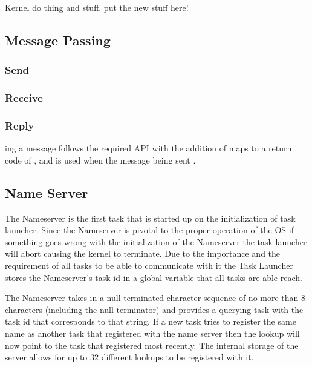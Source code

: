 \documentclass[pdftex,10pt,a4paper]{article}
\begin{document}
Kernel do thing and stuff. put the new stuff here!

\subsection*{Message Passing}

\subsubsection*{Send}

\subsubsection*{Receive}

\subsubsection*{Reply}

ing a message follows the required API with the addition of
 maps to a return code of , and is used
when the message being sent .


\subsection*{Name Server}

The Nameserver is the first task that is started up on the initialization of
task launcher. Since the Nameserver is pivotal to the proper operation of the
OS if something goes wrong with the initialization of the Nameserver the task
launcher will abort causing the kernel to terminate. Due to the importance and
the requirement of all tasks to be able to communicate with it the Task Launcher
stores the Nameserver’s task id in a global variable that all tasks are able reach.

The Nameserver takes in a null terminated character sequence of no more than 8
characters (including the null terminator) and provides a querying task with
the task id that corresponds to that string. If a new task tries to register
the same name as another task that registered with the name server then the
lookup will now point to the task that registered most recently. The internal
storage of the server allows for up to 32 different lookups to be registered with it.
\end{document}
